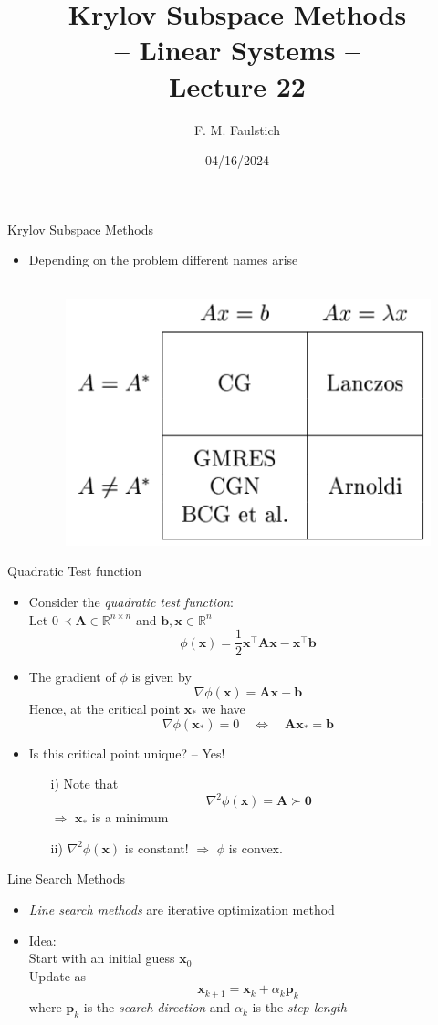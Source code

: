 \documentclass{beamer}
\title{
Krylov Subspace Methods\\ -- Linear Systems -- \\
Lecture 22
}
\author{F. M. Faulstich}
\date{04/16/2024}
\newcommand{\bgk}[1]{\boldsymbol{#1}}
\newcommand{\bzero}{\bgk{0}}
\newcommand{\bvec}[1]{\mathbf{#1}}
\newcommand{\vb}{\bvec{b}}
\newcommand{\vp}{\bvec{p}}
\newcommand{\vx}{\bvec{x}}
\newcommand{\vA}{\bvec{A}}
\newcommand{\bitem}{\item[$\bullet$]}
\begin{document}
\frame{\titlepage}


\begin{frame}{Krylov Subspace Methods}

\begin{itemize}
    \bitem Depending on the problem different names arise\\
    ~\\
    \begin{figure}
        \centering
        \includegraphics[width=.5\textwidth]{Graphics/KrylovMethods.png}
    \end{figure}
\end{itemize}
    
\end{frame}

\begin{frame}{Quadratic Test function}

\begin{itemize}
    \bitem Consider the {\it quadratic test function}:\\
    Let $0 \prec \vA \in\mathbb{R}^{n \times n} $ and $\vb,\vx \in \mathbb{R}^n$
    $$
    \phi(\vx) = \frac{1}{2}\vx^\top \vA \vx - \vx^\top \vb
    $$
    \bitem The gradient of $\phi$ is given by
    $$
    \nabla \phi (\vx)
    =
    \vA\vx - \vb
    $$
    Hence, at the critical point $\vx_*$ we have
    $$
    \nabla \phi (\vx_*) = 0 \quad \Leftrightarrow \quad \vA \vx_* = \vb
    $$
    \bitem Is this critical point unique? -- Yes!
    \begin{itemize}
        \item[i)] Note that 
        $$
        \nabla^2 \phi(\vx)= \vA \succ \bzero
        $$
        $\Rightarrow$ $\vx_*$ is a minimum
        \item[ii)] $\nabla^2 \phi(\vx)$ is constant! $\Rightarrow$ $\phi$ is convex.
    \end{itemize}
\end{itemize}
    
\end{frame}

\begin{frame}{Line Search Methods}

\begin{itemize}
    \bitem {\it Line search methods} are iterative optimization method
    \bitem Idea:\\
    Start with an initial guess $\vx_0$\\ 
    Update as
    $$
    \vx_{k+1} = \vx_k + \alpha_k \vp_k
    $$
    where $\vp_k$ is the {\it search direction}
    and $\alpha_k$ is the {\it step length}
\end{itemize}
    
\end{frame}
\end{document}
